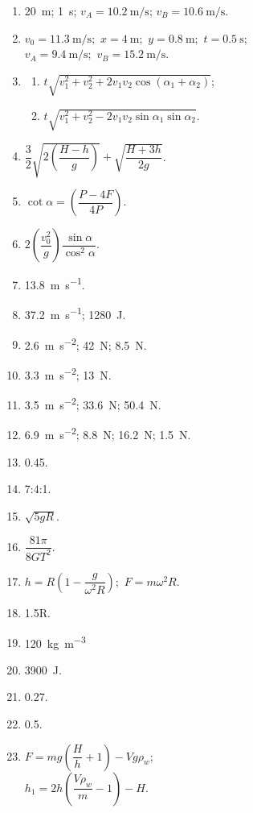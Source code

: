 \documentclass[a4paper,sfsidenotes]{tufte-book}
\begin{document}
\begin{enumerate}[label=\arabic*.]
\item \SI{20}{\metre};  \SI{1}{\second};  $v_{A} = \SI[per-mode=symbol]{10.2}{\metre\per\second}$; $v_{B} = \SI[per-mode=symbol]{10.6}{\metre\per\second}.$
\item $v_{0}= \SI[per-mode=symbol]{11.3}{\metre\per\second}; \,\, x = \SI{4}{\metre}; \,\, y =  \SI{0.8}{\metre}; \,\, t = \SI{0.5}{\second};$\\
$ v_{A}=\SI[per-mode=symbol]{9.4}{\metre\per\second}; \,\,v_{B}=\SI[per-mode=symbol]{15.2}{\metre\per\second}$.
\item 
\begin{enumerate}[label=(\arabic*)]
\item $t \sqrt{v_{1}^{2} + v_{2}^{2} + 2v_{1}v_{2} \cos (\alpha_{1} + \alpha_{2})}$;
\item $t \sqrt{v_{1}^{2} + v_{2}^{2} - 2v_{1}v_{2} \sin \alpha_{1} \sin \alpha_{2} }$.
\end{enumerate}
\item $\dfrac{3}{2} \sqrt{2 \left( \dfrac{H-h}{g} \right)} + \sqrt{\dfrac{H+3h}{2g}}$.
\item $\cot \alpha = \left( \dfrac{P-4F}{4P} \right)$.
\item $ 2 \left( \dfrac{v_{0}^{2}}{g} \right) \dfrac{\sin \alpha}{\cos^{2} \alpha}$.
\item \SI[per-mode=symbol]{13.8}{\metre\per\second}.
\item \SI[per-mode=symbol]{37.2}{\metre\per\second}; \SI{1280}{\joule}.
\item \SI[per-mode=symbol]{2.6}{\metre\per\second\squared}; \SI{42}{\newton}; \SI{8.5}{\newton}.
\item \SI[per-mode=symbol]{3.3}{\metre\per\second\squared}; \SI{13}{\newton}.
\item \SI[per-mode=symbol]{3.5}{\metre\per\second\squared}; \SI{33.6}{\newton}; \SI{50.4}{\newton}.
\item \SI[per-mode=symbol]{6.9}{\metre\per\second\squared}; \SI{8.8}{\newton}; \SI{16.2}{\newton}; \SI{1.5}{\newton}.
\addtocounter{enumi}{2}
\item 0.45.
\item 7:4:1.
\item $\sqrt{5gR}$.
\item $\dfrac{81 \pi}{8 GT^{2}}$.
\item  $h=R \left(1- \dfrac{g}{\omega^{2} R} \right);\,\, F=m\omega^{2} R$.
\item 1.5R.
\item \SI[per-mode=symbol]{120}{\kilo\gram\per\metre\cubed}
\item \SI{3900}{\joule}.
\item 0.27.
\item 0.5.
\item 
$F =mg \left( \dfrac{H}{h} + 1 \right) - V g \rho_{w}; $\\
$h_{1} = 2h \left( \dfrac{V \rho_{w}}{m} - 1 \right) - H.$


\end{enumerate}
\end{document}
